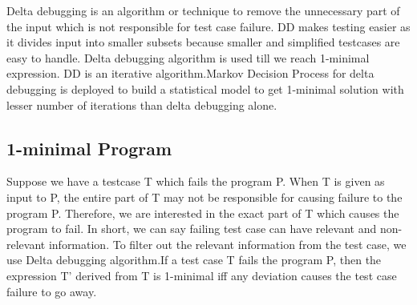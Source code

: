 \documentclass{relatorio}
\begin{document}
Delta debugging is an algorithm or technique to remove the unnecessary part of the input which is not responsible for test case failure. DD makes testing easier as it divides input into smaller subsets because smaller  and simplified testcases are easy to handle. Delta debugging algorithm is used till we reach 1-minimal expression. DD is an iterative algorithm.Markov Decision Process for delta debugging is deployed to build a statistical model to get 1-minimal solution with lesser number of iterations than delta debugging alone.


\subsection{1-minimal Program}%
\label{Tools}

Suppose we have a testcase T which fails the program P. When T is given as input to P, the entire part of T may not be responsible for causing failure to the program P. Therefore, we are interested in the exact part of T which causes the program to fail. In short, we can say failing test case can have relevant and non-relevant information. To filter out the relevant information from the test case, we use Delta debugging algorithm.If a test case T fails the program P, then the expression T’ derived from T is 1-minimal iff any deviation causes the test case failure to go away.
\end{document}
